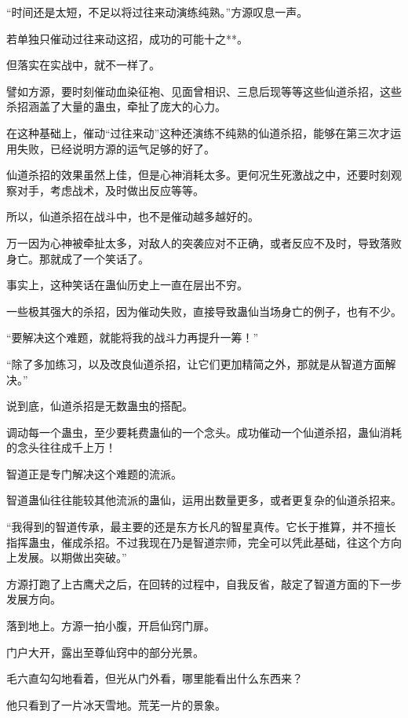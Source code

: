 
\begin{this_body}

“时间还是太短，不足以将过往来动演练纯熟。”方源叹息一声。

若单独只催动过往来动这招，成功的可能十之**。

但落实在实战中，就不一样了。

譬如方源，要时刻催动血染征袍、见面曾相识、三息后现等等这些仙道杀招，这些杀招涵盖了大量的蛊虫，牵扯了庞大的心力。

在这种基础上，催动“过往来动”这种还演练不纯熟的仙道杀招，能够在第三次才运用失败，已经说明方源的运气足够的好了。

仙道杀招的效果虽然上佳，但是心神消耗太多。更何况生死激战之中，还要时刻观察对手，考虑战术，及时做出反应等等。

所以，仙道杀招在战斗中，也不是催动越多越好的。

万一因为心神被牵扯太多，对敌人的突袭应对不正确，或者反应不及时，导致落败身亡。那就成了一个笑话了。

事实上，这种笑话在蛊仙历史上一直在层出不穷。

一些极其强大的杀招，因为催动失败，直接导致蛊仙当场身亡的例子，也有不少。

“要解决这个难题，就能将我的战斗力再提升一筹！”

“除了多加练习，以及改良仙道杀招，让它们更加精简之外，那就是从智道方面解决。”

说到底，仙道杀招是无数蛊虫的搭配。

调动每一个蛊虫，至少要耗费蛊仙的一个念头。成功催动一个仙道杀招，蛊仙消耗的念头往往成千上万！

智道正是专门解决这个难题的流派。

智道蛊仙往往能较其他流派的蛊仙，运用出数量更多，或者更复杂的仙道杀招来。

“我得到的智道传承，最主要的还是东方长凡的智星真传。它长于推算，并不擅长指挥蛊虫，催成杀招。不过我现在乃是智道宗师，完全可以凭此基础，往这个方向上发展。以期做出突破。”

方源打跑了上古鹰犬之后，在回转的过程中，自我反省，敲定了智道方面的下一步发展方向。

落到地上。方源一拍小腹，开启仙窍门扉。

门户大开，露出至尊仙窍中的部分光景。

毛六直勾勾地看着，但光从门外看，哪里能看出什么东西来？

他只看到了一片冰天雪地。荒芜一片的景象。


\end{this_body}

